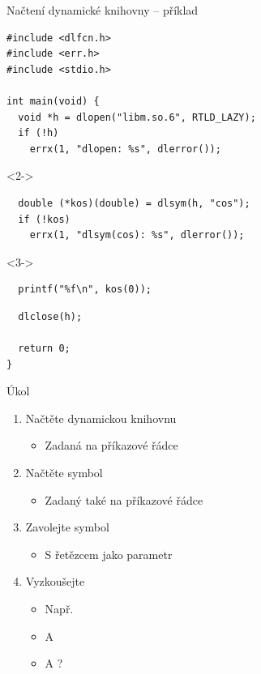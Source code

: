 \begin{frame}[fragile]{Načtení dynamické knihovny -- příklad}

  \begin{lstlisting}[aboveskip=2pt,belowskip=2pt]
#include <dlfcn.h>
#include <err.h>
#include <stdio.h>

int main(void) {
  void *h = dlopen("libm.so.6", RTLD_LAZY);
  if (!h)
    errx(1, "dlopen: %s", dlerror());
  \end{lstlisting}
  \begin{uncoverenv}<2->
  \begin{lstlisting}
  double (*kos)(double) = dlsym(h, "cos");
  if (!kos)
    errx(1, "dlsym(cos): %s", dlerror());
  \end{lstlisting}
  \end{uncoverenv}
  \begin{uncoverenv}<3->
  \begin{lstlisting}
  printf("%f\n", kos(0));
  \end{lstlisting}
  \end{uncoverenv}
  \begin{lstlisting}
  dlclose(h);

  return 0;
}
  \end{lstlisting}

\end{frame}

\begin{frame}{Úkol}

  \begin{enumerate}
    \item Načtěte dynamickou knihovnu
    \begin{itemize}
      \item Zadaná na příkazové řádce
    \end{itemize}

    \item Načtěte symbol
    \begin{itemize}
      \item Zadaný také na příkazové řádce
    \end{itemize}

    \item Zavolejte symbol
    \begin{itemize}
      \item S řetězcem jako parametr
    \end{itemize}
    \item Vyzkoušejte
    \begin{itemize}
      \item Např.\ 
      \item A 
      \item A ?
    \end{itemize}
  \end{enumerate}

\end{frame}

